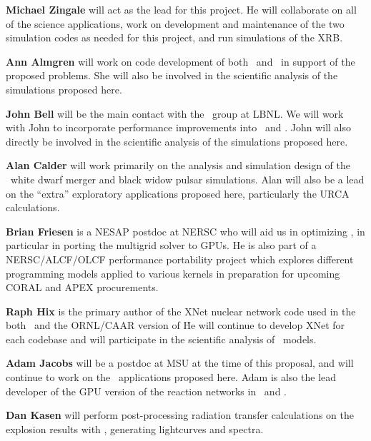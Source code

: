 \documentclass[11pt,letterpaper,english]{article}
\begin{document}
\begin{tightitem}
\item {\bf Michael Zingale} will act as the lead for this project.  He
  will collaborate on all of the science applications, work on
  development and maintenance of the two simulation codes as needed
  for this project, and run simulations of the XRB.

\item {\bf Ann Almgren} will work on code development of both \maestro\
  and \castro\ in support of the proposed problems.  She will also be
  involved in the scientific analysis of the simulations proposed here.

\item {\bf John Bell} will be the main contact with the \boxlib\ group
  at LBNL.  We will work with John to incorporate performance
  improvements into \maestro\ and \castro.  John will also directly be
  involved in the scientific analysis of the simulations proposed
  here.

\item {\bf Alan Calder} will work primarily on the analysis and
  simulation design of the \castro\ white dwarf merger and
  black widow pulsar simulations.
  Alan will also be a lead on the ``extra'' exploratory applications
  proposed here, particularly the URCA calculations.

\item {\bf Brian Friesen} is a NESAP postdoc at NERSC who will aid us in
  optimizing \boxlib, in particular in porting the multigrid solver to GPUs.
  He is also part of a NERSC/ALCF/OLCF performance portability project which
  explores different programming models applied to various kernels in
  preparation for upcoming CORAL and APEX procurements.

\item {\bf Raph Hix} is the primary author of the XNet nuclear network code used 
in the both \chimera\ and the ORNL/CAAR version of \flash\. He will continue to 
develop XNet for each codebase and will participate in the scientific analysis of \chimera\ models. 

\item {\bf Adam Jacobs} will be a postdoc at MSU at the time of this
  proposal, and will continue to work on the \maestro\ applications
  proposed here.  Adam is also the lead developer of the GPU version
  of the reaction networks in \maestro\ and \castro.

\item {\bf Dan Kasen} will perform post-processing radiation transfer
  calculations on the explosion results with \sedona, generating
  lightcurves and spectra.


\end{tightitem}
\end{document}
